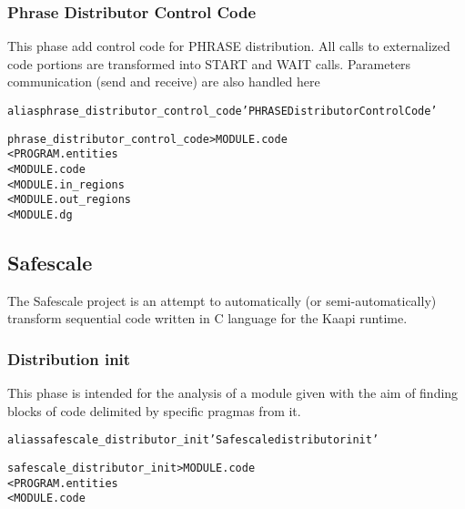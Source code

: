 \documentclass[a4paper]{report}
\newenvironment{PipsMake}{\begin{alltt}}{\end{alltt}}
\newenvironment{PipsPass}[1]{\label{pass:#1}}{}
\begin{document}
\subsubsection{Phrase Distributor Control Code}

\begin{PipsPass}{phrase_distributor_control_code}
This phase add control code for PHRASE distribution. All calls to
externalized code portions are transformed into START and WAIT calls.
Parameters communication (send and receive) are also handled here
\end{PipsPass}

\begin{PipsMake}
alias phrase_distributor_control_code 'PHRASE Distributor Control Code'

phrase_distributor_control_code          > MODULE.code
        < PROGRAM.entities
        < MODULE.code
        < MODULE.in_regions
        < MODULE.out_regions
        < MODULE.dg
\end{PipsMake}




\subsection{Safescale}
\label{subsubsection_safescale_module_analysis}

The Safescale project is an attempt to automatically (or semi-automatically)
transform sequential code written in C language for the Kaapi runtime.

\subsubsection{Distribution init}

\begin{PipsPass}{saferscale_distributor_init}
This phase is intended for the analysis of a module given with the aim of finding
blocks of code delimited by specific pragmas from it.
\end{PipsPass}

\begin{PipsMake}
alias safescale_distributor_init 'Safescale distributor init'

safescale_distributor_init                  > MODULE.code
        < PROGRAM.entities
        < MODULE.code
\end{PipsMake}
\end{document}
